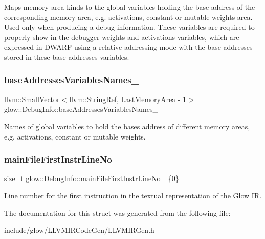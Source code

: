 Maps memory area kinds to the global variables holding the base address of the corresponding memory area, e.\+g. activations, constant or mutable weights area. Used only when producing a debug information. These variables are required to properly show in the debugger weights and activations variables, which are expressed in D\+W\+A\+RF using a relative addressing mode with the base addresses stored in these base addresses variables. \mbox{\label{structglow_1_1_debug_info_aedd8c89215db736c9099b56e0c318c72}} 
\subsubsection{\texorpdfstring{base\+Addresses\+Variables\+Names\+\_\+}{baseAddressesVariablesNames\_}}
{\footnotesize\ttfamily llvm\+::\+Small\+Vector$<$llvm\+::\+String\+Ref, Last\+Memory\+Area -\/ 1$>$ glow\+::\+Debug\+Info\+::base\+Addresses\+Variables\+Names\+\_\+}

Names of global variables to hold the bases address of different memory areas, e.\+g. activations, constant or mutable weights. \mbox{\label{structglow_1_1_debug_info_a099a2636f46176f7804f55b2374c64c2}} 
\subsubsection{\texorpdfstring{main\+File\+First\+Instr\+Line\+No\+\_\+}{mainFileFirstInstrLineNo\_}}
{\footnotesize\ttfamily size\+\_\+t glow\+::\+Debug\+Info\+::main\+File\+First\+Instr\+Line\+No\+\_\+ \{0\}}

Line number for the first instruction in the textual representation of the Glow IR. 

The documentation for this struct was generated from the following file\+:\begin{DoxyCompactItemize}
\item 
include/glow/\+L\+L\+V\+M\+I\+R\+Code\+Gen/L\+L\+V\+M\+I\+R\+Gen.\+h\end{DoxyCompactItemize}
